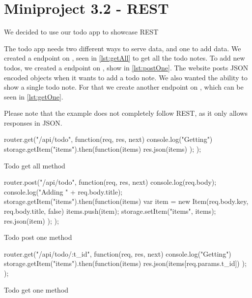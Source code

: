 \chapter{Miniproject 3.2 - REST}
We decided to use our todo app to showcase REST

The todo app needs two different ways to serve data, and one to add data. We
created a  endpoint on , seen in
\cref{lst:getAll} to get all the todo notes. To add new todos, we created
a  endpoint on , show in \cref{lst:postOne}. The
website posts JSON encoded objects when it wants to add a todo note. We also
wanted the ability to show a single todo note. For that we create another
 endpoint on , which can be seen in
\cref{lst:getOne}.

Please note that the example does not completely follow REST, as it only allows
responses in JSON.

\begin{listing}
    \begin{js}
router.get("/api/todo", function(req, res, next) {
	console.log("Getting")
	storage.getItem("items").then(function(items) {
		res.json(items)
	});
});
    \end{js}
    \caption{Todo get all method}\label{lst:getAll}
\end{listing}

\begin{listing}
    \begin{js}
router.post("/api/todo", function(req, res, next) {
	console.log(req.body);
	console.log("Adding " + req.body.title);
	storage.getItem("items").then(function(items) {
		var item = new Item(req.body.key, req.body.title, false)
		items.push(item);
		storage.setItem("items", items);
		res.json(item)
	});
});
    \end{js}
    \caption{Todo post one method}\label{lst:postOne}
\end{listing}

\begin{listing}
    \begin{js}
router.get("/api/todo/:t_id", function(req, res, next) {
	console.log("Getting")
	storage.getItem("items").then(function(items) {
		res.json(items[req.params.t_id])
	});
});
    \end{js}
    \caption{Todo get one method}\label{lst:getOne}
\end{listing}
